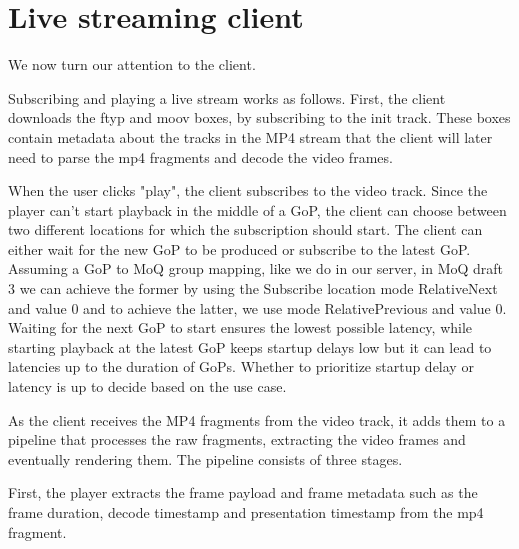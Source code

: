 
\section{Live streaming client}\label{section:baseline_client}
We now turn our attention to the client.

Subscribing and playing a live stream works as follows. First, the client downloads the ftyp and moov boxes, by subscribing to the init track. These boxes contain metadata about the tracks in the MP4 stream %
that the client will later need to parse the mp4 fragments and decode the video frames.

When the user clicks "play", the client subscribes to the video track. Since the player can't start playback in the middle of a GoP, the client can choose between two different locations for which the subscription should start. The client can either wait for the new GoP to be produced or subscribe to the latest GoP. Assuming a GoP to MoQ group mapping, like we do in our server, in MoQ draft 3 we can achieve the former by using the Subscribe location mode RelativeNext and value 0 and to achieve the latter, we use mode RelativePrevious and value 0. Waiting for the next GoP to start ensures the lowest possible latency, while starting playback at the latest GoP keeps startup delays low but it can lead to latencies up to the duration of GoPs. %
Whether to prioritize startup delay or latency is up to decide based on the use case.

As the client receives the MP4 fragments from the video track, it adds them to a pipeline that processes the raw fragments, extracting the video frames and eventually rendering them. The pipeline consists of three stages. 

First, the player extracts the frame payload and frame metadata such as the frame duration, decode timestamp and presentation timestamp from the mp4 fragment. 

